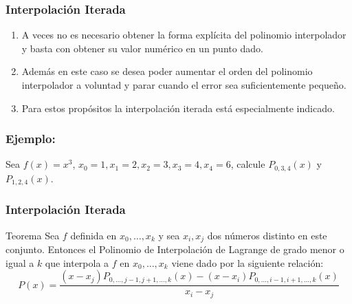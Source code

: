 \documentclass[10pt]{beamer}
\begin{document}
{
\frametitle{Interpolaci\'on Iterada}
\begin{enumerate}
 \item<1-> A veces no es necesario obtener la forma expl\'icita del polinomio interpolador y basta con obtener su valor num\'erico 
 en un punto dado. 
 \item<2-> Adem\'as en este caso se desea poder aumentar el orden del polinomio interpolador a voluntad y parar 
 cuando el error sea suficientemente peque\~no. 
 \item<3-> Para estos prop\'ositos la interpolaci\'on iterada est\'a especialmente 
 indicado. 
\end{enumerate}
}
\frame
{
\frametitle{Ejemplo:}
Sea $f(x) = x^3$, $x_0 = 1, x_1 = 2, x_2 = 3, x_3 = 4, x_4 = 6$, calcule $P_{0,3,4}(x)$ y 
$P_{1,2,4}(x)$.
}
\frame
{
\frametitle{Interpolaci\'on Iterada}
\begin{block}{Teorema}
  Sea $f$ definida en $x_0,\ldots,x_k$ y sea $x_i,x_j$ dos n\'umeros distinto en este conjunto. Entonces el Polinomio de 
 Interpolaci\'on de Lagrange de grado menor o igual a $k$ que interpola a $f$ en $x_0,\ldots,x_k$ viene dado por la 
 siguiente relaci\'on:
 $$
 P(x) = \dfrac{(x-x_j)P_{0,\ldots,j-1,j+1,\ldots,k}(x) - (x-x_i)P_{0,\ldots,i-1,i+1,\ldots,k}(x)}{x_i - x_j}
 $$
 \end{block}
}
\end{document}

